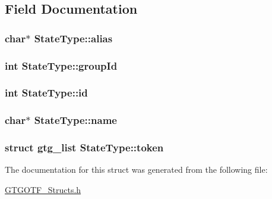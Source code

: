 \subsection{Field Documentation}
\hypertarget{structStateType_a80c2819cc7a07b01c41b7029ff857411}{
\subsubsection[{alias}]{\setlength{\rightskip}{0pt plus 5cm}char$\ast$ State\-Type\-::alias}}\label{structStateType_a80c2819cc7a07b01c41b7029ff857411}
\hypertarget{structStateType_a66cf0c397f84194ac6a5326f262d200d}{
\subsubsection[{group\-Id}]{\setlength{\rightskip}{0pt plus 5cm}int State\-Type\-::group\-Id}}\label{structStateType_a66cf0c397f84194ac6a5326f262d200d}
\hypertarget{structStateType_a14249c9d77e0bf8efa00f5ca7f38b001}{
\subsubsection[{id}]{\setlength{\rightskip}{0pt plus 5cm}int State\-Type\-::id}}\label{structStateType_a14249c9d77e0bf8efa00f5ca7f38b001}
\hypertarget{structStateType_a032633fe3f7393284c730316651c45a7}{
\subsubsection[{name}]{\setlength{\rightskip}{0pt plus 5cm}char$\ast$ State\-Type\-::name}}\label{structStateType_a032633fe3f7393284c730316651c45a7}
\hypertarget{structStateType_a39d6516ad97438053c7ffa5cf2cf7d19}{
\subsubsection[{token}]{\setlength{\rightskip}{0pt plus 5cm}struct {\bf gtg\-\_\-list} State\-Type\-::token}}\label{structStateType_a39d6516ad97438053c7ffa5cf2cf7d19}


The documentation for this struct was generated from the following file\-:\begin{DoxyCompactItemize}
\item 
\hyperlink{GTGOTF__Structs_8h}{G\-T\-G\-O\-T\-F\-\_\-\-Structs.\-h}\end{DoxyCompactItemize}
